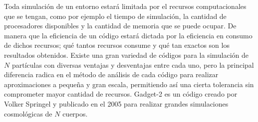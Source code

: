Toda simulación de un entorno estará limitada por el recursos computacionales que se tengan, como por ejemplo el tiempo de simulación, la cantidad de procesadores disponibles y la cantidad de memoria que se puede ocupar. De manera que la eficiencia de un código estará dictada por la eficiencia en consumo de dichos recursos; qué tantos recursos consume y qué tan exactos son los resultados obtenidos. Existe una gran variedad de códigos para la simulación de $N$ partículas con diversas ventajas y desventajas entre cada uno, pero la principal diferencia radica en el método de análisis de cada código para realizar aproximaciones a pequeña y gran escala, permitiendo así una cierta tolerancia sin comprometer mayor cantidad de recursos. Gadget-2 es un código creado por Volker Springel y publicado en el 2005\cite{gadget} para realizar grandes simulaciones cosmológicas de $N$ cuerpos. 


